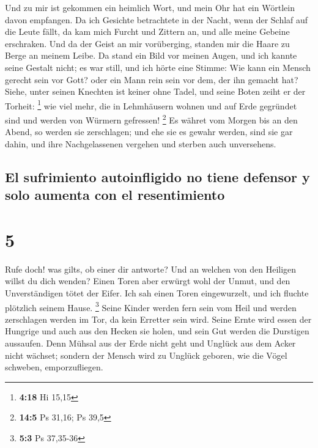  Und zu mir ist gekommen ein heimlich Wort, und mein Ohr
hat ein Wörtlein davon empfangen.  Da ich Gesichte
betrachtete in der Nacht, wenn der Schlaf auf die Leute fällt,
 da kam mich Furcht und Zittern an, und alle meine
Gebeine erschraken.  Und da der Geist an mir vorüberging,
standen mir die Haare zu Berge an meinem Leibe.  Da stand
ein Bild vor meinen Augen, und ich kannte seine Gestalt nicht; es war
still, und ich hörte eine Stimme:  Wie kann ein Mensch
gerecht sein vor Gott? oder ein Mann rein sein vor dem, der ihn gemacht
hat?  Siehe, unter seinen Knechten ist keiner ohne Tadel,
und seine Boten zeiht er der Torheit: \footnote{\textbf{4:18} Hi 15,15}
 wie viel mehr, die in Lehmhäusern wohnen und auf Erde
gegründet sind und werden von Würmern gefressen! \footnote{\textbf{14:5}
  Ps 31,16; Ps 39,5}  Es währet vom Morgen bis an den
Abend, so werden sie zerschlagen; und ehe sie es gewahr werden, sind sie
gar dahin,  und ihre Nachgelassenen vergehen und sterben
auch unversehens.

\hypertarget{el-sufrimiento-autoinfligido-no-tiene-defensor-y-solo-aumenta-con-el-resentimiento}{%
\subsection{El sufrimiento autoinfligido no tiene defensor y solo
aumenta con el
resentimiento}\label{el-sufrimiento-autoinfligido-no-tiene-defensor-y-solo-aumenta-con-el-resentimiento}}

\hypertarget{section-4}{%
\section{5}\label{section-4}}

 Rufe doch! was gilts, ob einer dir antworte? Und an
welchen von den Heiligen willst du dich wenden?  Einen
Toren aber erwürgt wohl der Unmut, und den Unverständigen tötet der
Eifer.  Ich sah einen Toren eingewurzelt, und ich fluchte
plötzlich seinem Hause. \footnote{\textbf{5:3} Ps 37,35-36}
 Seine Kinder werden fern sein vom Heil und werden
zerschlagen werden im Tor, da kein Erretter sein wird. 
Seine Ernte wird essen der Hungrige und auch aus den Hecken sie holen,
und sein Gut werden die Durstigen aussaufen.  Denn Mühsal
aus der Erde nicht geht und Unglück aus dem Acker nicht wächset;
 sondern der Mensch wird zu Unglück geboren, wie die Vögel
schweben, emporzufliegen.

